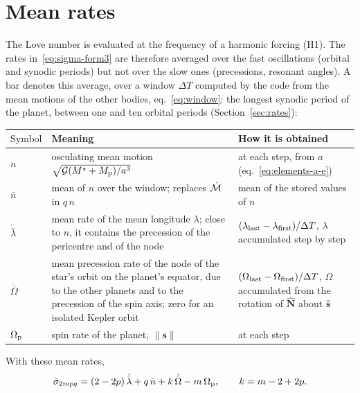 \section{Mean rates}
The Love number is evaluated at the frequency of a harmonic forcing (H1). The rates in~\eqref{eq:sigma-form3} are therefore averaged over the fast oscillations (orbital and synodic periods) but not over the slow ones (precessions, resonant angles). A bar denotes this average, over a window $\Delta T$ computed by the code from the mean motions of the other bodies, eq.~\eqref{eq:window}: the longest synodic period of the planet, between one and ten orbital periods (Section~\ref{sec:rates}):
\begin{center}\small
\renewcommand{\arraystretch}{1.25}
\begin{tabular}{>{$}l<{$}p{7.2cm}p{5.6cm}}\toprule
\text{Symbol} & Meaning & How it is obtained\\\midrule
n & osculating mean motion $\sqrt{\G(M^\star+M_{\mathrm p})/a^3}$ & at each step, from $a$ (eq.~\ref{eq:elements-a-e})\\
\bar n & mean of $n$ over the window; replaces $\dot\M$ in $q\,n$ & mean of the stored values of $n$\\
\dot{\bar\lambda} & mean rate of the mean longitude $\lambda$; close to $n$, it contains the precession of the pericentre and of the node & $(\lambda_{\rm last}-\lambda_{\rm first})/\Delta T$, $\lambda$ accumulated step by step\\
\dot{\bar\Omega} & mean precession rate of the node of the star's orbit on the planet's equator, due to the other planets and to the precession of the spin axis; zero for an isolated Kepler orbit & $(\Omega_{\rm last}-\Omega_{\rm first})/\Delta T$, $\Omega$ accumulated from the rotation of $\hat{\mathbf N}$ about $\hat{\mathbf s}$\\
\Op & spin rate of the planet, $\|\mathbf s\|$ & at each step\\\bottomrule
\end{tabular}
\end{center}
With these mean rates,
\[
  \bar\sigma_{2mpq}=(2-2p)\,\dot{\bar\lambda}+q\,\bar n+k\,\dot{\bar\Omega}-m\,\Op,\qquad k=m-2+2p .
\]
